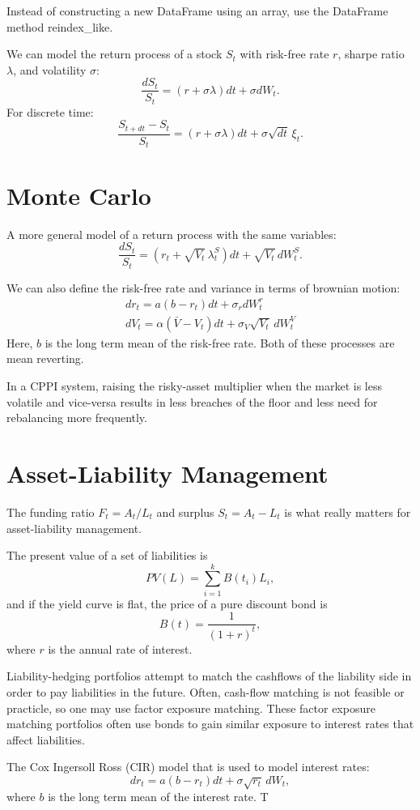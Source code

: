 \documentclass{article}
\begin{document}
Instead of constructing a new DataFrame using an array,
use the DataFrame method reindex\_like.

We can model the return process of a stock $S_t$
with risk-free rate $r$, sharpe ratio $\lambda$,
and volatility $\sigma$: 
\[
\frac{dS_t}{S_t} = 
(r + \sigma \lambda)dt + \sigma dW_t.
\]
For discrete time:
\[
\frac{S_{t+dt} - S_t}{S_t} =
(r + \sigma \lambda)dt +
\sigma \sqrt{dt} \, \xi_t.
\]

\section[3.2]{Monte Carlo}

A more general model of a return process
with the same variables: 
\[
\frac{dS_t}{S_t} = 
\left(r_t + \sqrt{V_t} \, \lambda_t^S\right)dt +
\sqrt{V_t} \, dW_t^S.
\]

We can also define the risk-free rate and variance
in terms of brownian motion: 
\begin{gather}
    dr_t = a(b-r_t)dt + \sigma_r dW_t^r \nonumber \\
    dV_t = \alpha(\bar{V} - V_t)dt + 
    \sigma_V \sqrt{V_t} \, dW_t^V \nonumber
\end{gather}
Here, $b$ is the long term mean of the risk-free rate.
Both of these processes are mean reverting. 

In a CPPI system, raising the risky-asset multiplier
when the market is less volatile and vice-versa results
in less breaches of the floor and less need for 
rebalancing more frequently. 

\section[4.1]{Asset-Liability Management}

The funding ratio $F_t = {A_t}/{L_t}$ and surplus
$S_t = A_t - L_t$ is what really matters
for asset-liability management.  

The present value of a set of liabilities is
\[
PV(L) = \sum_{i=1}^k B(t_i)L_i,
\]
and if the yield curve is flat, 
the price of a pure discount bond is 
\[
B(t) = \frac{1}{(1+r)^t}, 
\]
where $r$ is the annual rate of interest. 

Liability-hedging portfolios attempt to match the cashflows of
the liability side in order to pay liabilities in the future. 
Often, cash-flow matching is not feasible or practicle, so one may
use factor exposure matching. These factor exposure matching portfolios
often use bonds to gain similar exposure to interest rates that affect
liabilities. 

The Cox Ingersoll Ross (CIR) model that is used to model interest rates:
\[
dr_t = a(b-r_t)dt + \sigma \sqrt{r_t} \, dW_t,
\]
where $b$ is the long term mean of the interest rate. 
T
\end{document}
